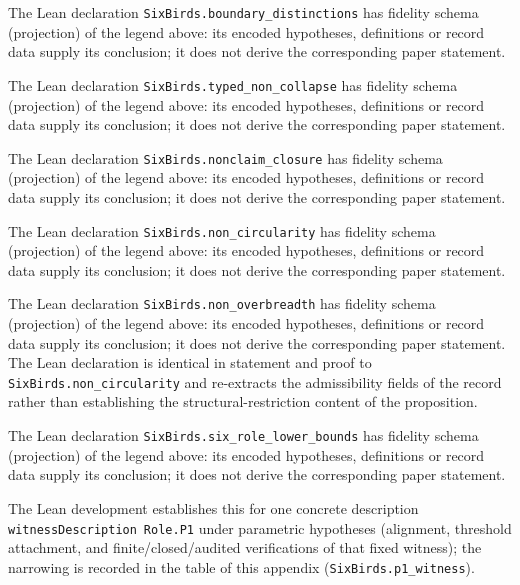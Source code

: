 \begin{description}[style=unboxed,leftmargin=0pt,itemsep=3pt]
  \item[Proposition~\ref{prop:boundary-distinctions}.] The Lean declaration \texttt{SixBirds.boundary\_distinctions} has fidelity schema (projection) of the legend above: its encoded hypotheses, definitions or record data supply its conclusion; it does not derive the corresponding paper statement.
  \item[Proposition~\ref{prop:typed-non-collapse}.] The Lean declaration \texttt{SixBirds.typed\_non\_collapse} has fidelity schema (projection) of the legend above: its encoded hypotheses, definitions or record data supply its conclusion; it does not derive the corresponding paper statement.
  \item[Proposition~\ref{prop:nonclaim-closure}.] The Lean declaration \texttt{SixBirds.nonclaim\_closure} has fidelity schema (projection) of the legend above: its encoded hypotheses, definitions or record data supply its conclusion; it does not derive the corresponding paper statement.
  \item[Proposition~\ref{prop:non-circularity}.] The Lean declaration \texttt{SixBirds.non\_circularity} has fidelity schema (projection) of the legend above: its encoded hypotheses, definitions or record data supply its conclusion; it does not derive the corresponding paper statement.
  \item[Proposition~\ref{prop:non-overbreadth}.] The Lean declaration \texttt{SixBirds.non\_overbreadth} has fidelity schema (projection) of the legend above: its encoded hypotheses, definitions or record data supply its conclusion; it does not derive the corresponding paper statement. The Lean declaration is identical in statement and proof to \texttt{SixBirds.non\_circularity} and re-extracts the admissibility fields of the record rather than establishing the structural-restriction content of the proposition.
  \item[Theorem~\ref{thm:six-role-lower-bounds}.] The Lean declaration \texttt{SixBirds.six\_role\_lower\_bounds} has fidelity schema (projection) of the legend above: its encoded hypotheses, definitions or record data supply its conclusion; it does not derive the corresponding paper statement.
  \item[Proposition~\ref{prop:p1-witness}.] The Lean development establishes this for one concrete description \texttt{witnessDescription}\allowbreak\ \texttt{Role.P1} under parametric hypotheses (alignment, threshold attachment, and finite/\allowbreak closed/\allowbreak audited verifications of that fixed witness); the narrowing is recorded in the table of this appendix (\texttt{SixBirds.p1\_witness}).

\end{description}
